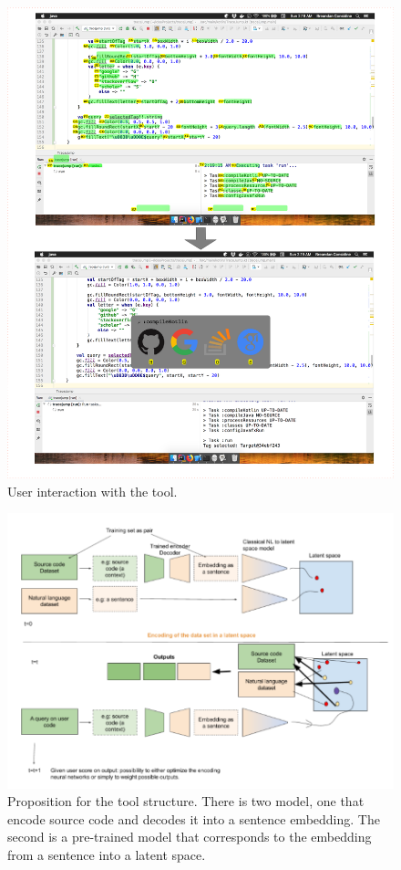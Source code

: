 \documentclass{article}
\begin{document}
\begin{figure}
    \includegraphics[width=\textwidth]{BreandanTool.png}
    \caption{User interaction with the tool. }
    \label{fig:my_label}
\end{figure}
\begin{figure}
    \includegraphics[width=\textwidth]{toolOrga2.PNG}
    \caption{Proposition for the tool structure. There is two model, one that encode source code and decodes it into a sentence embedding. The second is a pre-trained model that corresponds to the embedding from a sentence into a latent space.}
    \label{fig:Orga2}
\end{figure}
\end{document}

